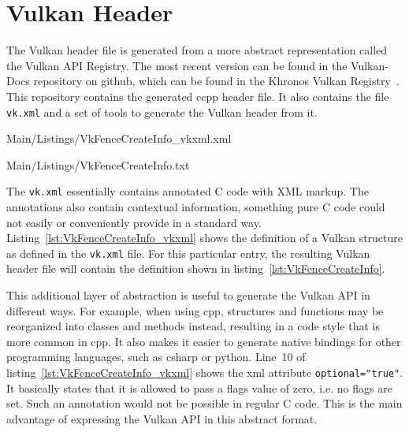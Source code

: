   \section{Vulkan Header}
  \label{sec:VulkanHeader}
    The Vulkan header file is generated from a more abstract representation called the Vulkan API Registry.
    The most recent version can be found in the Vulkan-Docs repository on \gls{github}, which can be found in the Khronos Vulkan Registry~\cite{vulkanregistry}.
    This repository contains the generated \gls{ccpp} header file.
    It also contains the file \lstinline{vk.xml} and a set of tools to generate the Vulkan header from it.

    
    {Main/Listings/VkFenceCreateInfo_vkxml.xml}

    
    {Main/Listings/VkFenceCreateInfo.txt}

    The \lstinline{vk.xml} essentially contains annotated C code with XML markup.
    The annotations also contain contextual information, something pure C code could not easily or conveniently provide in a standard way.
    Listing~\ref{lst:VkFenceCreateInfo_vkxml} shows the definition of a Vulkan structure as defined in the \lstinline{vk.xml} file.
    For this particular entry, the resulting Vulkan header file will contain the definition shown in listing~\ref{lst:VkFenceCreateInfo}.

    This additional layer of abstraction is useful to generate the Vulkan API in different ways.
    For example, when using \gls{cpp}, structures and functions may be reorganized into classes and methods instead, resulting in a code style that is more common in \gls{cpp}.
    It also makes it easier to generate native bindings for other programming languages, such as \gls{csharp} or \gls{python}.
    Line~10 of listing~\ref{lst:VkFenceCreateInfo_vkxml} shows the xml attribute \lstinline{optional="true"}.
    It basically states that it is allowed to pass a flags value of zero, i.e. no flags are set.
    Such an annotation would not be possible in regular C code.
    This is the main advantage of expressing the Vulkan API in this abstract format.


